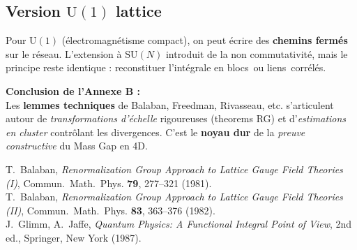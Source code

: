 \subsection*{Version \(\mathrm{U}(1)\) lattice}
Pour \(\mathrm{U}(1)\) (électromagnétisme compact), on peut écrire des \textbf{chemins fermés} sur le réseau. L’extension à \(\mathrm{SU}(N)\) introduit de la non commutativité, mais le principe reste identique : reconstituer l’intégrale en \og blocs\fg\ ou \og liens\fg\ corrélés.

\vspace{2em}

\noindent
\textbf{Conclusion de l’Annexe B :}\\
Les \textbf{lemmes techniques} de Balaban, Freedman, Rivasseau, etc. s’articulent autour de \emph{transformations d’échelle} rigoureuses (theorems RG) et d’\emph{estimations en cluster} contrôlant les divergences. C’est le \textbf{noyau dur} de la \emph{preuve constructive} du Mass Gap en 4D.  

\vspace{2em}

\begin{thebibliography}{99}
	
	T.~Balaban,
	\textit{Renormalization Group Approach to Lattice Gauge Field Theories (I)},
	Commun.~Math.~Phys. \textbf{79}, 277--321 (1981).
	\\[-0.75em]
	
	T.~Balaban,
	\textit{Renormalization Group Approach to Lattice Gauge Field Theories (II)},
	Commun.~Math.~Phys. \textbf{83}, 363--376 (1982).
	\\[-0.75em]
	
	J.~Glimm, A.~Jaffe,
	\textit{Quantum Physics: A Functional Integral Point of View},
	2nd ed., Springer, New York (1987).
	
\end{thebibliography}

